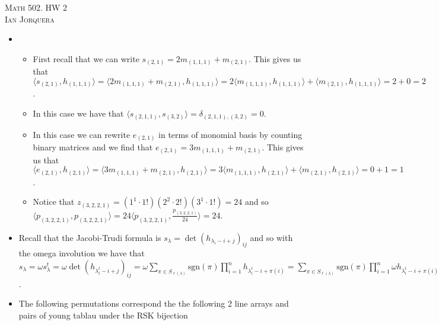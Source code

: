 \documentclass[12pt]{amsart}
\theoremstyle{definition}
\newcommand{\ip}[1]{\langle#1\rangle}
\begin{document}
\begin{center}
    \textsc{Math 502. HW 2\\ Ian Jorquera}
\end{center}
\vspace{1em}

\begin{itemize}

\item[(1)]
\begin{itemize}
    \item First recall that we can write $s_{(2,1)}=2m_{(1,1,1)}+m_{(2,1)}$. This gives us that $\ip{s_{(2,1)},h_{(1,1,1)}}=\ip{2m_{(1,1,1)}+m_{(2,1)},h_{(1,1,1)}}=2\ip{m_{(1,1,1)},h_{(1,1,1)}}+\ip{m_{(2,1)},h_{(1,1,1)}}=2+0=2$.\\
    \item In this case we have that $\ip{s_{(2,1,1)},s_{(3,2)}}=\delta_{{(2,1,1)},{(3,2)}}=0$.\\
    \item In this case we can rewrite $e_{(2,1)}$ in terms of monomial basis by counting binary matrices and we find that $e_{(2,1)}=3m_{(1,1,1)}+m_{(2,1)}$. This gives us that $\ip{e_{(2,1)},h_{(2,1)}}=\ip{3m_{(1,1,1)}+m_{(2,1)},h_{(2,1)}}=3\ip{m_{(1,1,1)},h_{(2,1)}}+\ip{m_{(2,1)},h_{(2,1)}}=0+1=1$.\\
    \item Notice that $z_{(3,2,2,1)}=(1^1\cdot 1!)(2^2\cdot 2!)(3^1\cdot 1!)=24$ and so $\ip{p_{(3,2,2,1)},p_{(3,2,2,1)}}=24\ip{p_{(3,2,2,1)},\frac{p_{(3,2,2,1)}}{24}}=24$.\\
\end{itemize}

\item[(2)] Recall that the Jacobi-Trudi formula is $s_\lambda=\det(h_{\lambda_i-i+j})_{ij}$ and so with the omega involution we have that $s_\lambda=\omega s_\lambda^t=\omega\det(h_{\lambda^t_i-i+j})_{ij}=\omega\sum_{\pi\in S_{\ell(\lambda)}}\text{sgn}(\pi)\prod_{i=1}^nh_{\lambda^t_i-i+\pi(i)}=\sum_{\pi\in S_{\ell(\lambda)}}\text{sgn}(\pi)\prod_{i=1}^n\omega  h_{\lambda^t_i-i+\pi(i)}=\sum_{\pi\in S_{\ell(\lambda)}}\text{sgn}(\pi)\prod_{i=1}^n e_{\lambda^t_i-i+\pi(i)}=\det(e_{\lambda^t_i-i+j})_{ij}$.\\

\item[(3)] The following permutations correspond the the following 2 line arrays and pairs of young tablau under the RSK bijection


\end{itemize}
\end{document}

